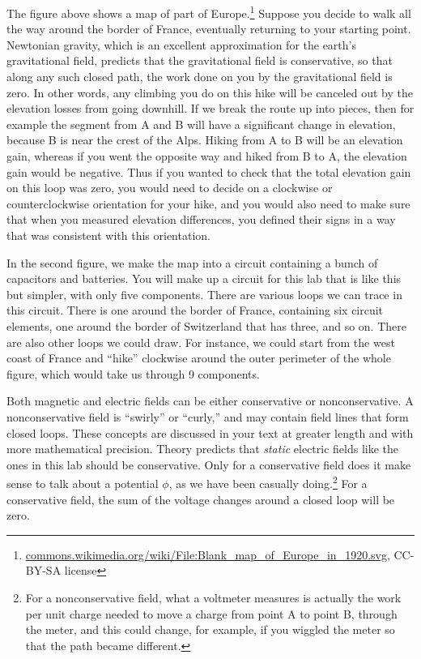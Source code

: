 The figure above shows a map of part of Europe.\footnote{\url{commons.wikimedia.org/wiki/File:Blank_map_of_Europe_in_1920.svg},
CC-BY-SA license} Suppose you decide to walk all the way around the border of France,
eventually returning to your starting point. Newtonian gravity, which is an excellent approximation for the earth's
gravitational field, predicts that the gravitational field is conservative, so that along any such closed path,
the work done on you by the gravitational field is zero. In other words, any climbing you do on this hike will be canceled
out by the elevation losses from going downhill. If we break the route up into pieces, then for example the segment
from A and B will have a significant change in elevation, because B is near the crest of the Alps. Hiking from A to B
will be an elevation gain, whereas if you went the opposite way and hiked from B to A, the elevation gain would be
negative. Thus if you wanted to check that the total elevation gain on this loop was zero, you would need to decide
on a clockwise or counterclockwise orientation for your hike, and you would also need to make sure that when you
measured elevation differences, you defined their signs in a way that was consistent with this orientation.

In the second figure, we make the map into a circuit containing a bunch of capacitors and batteries. You will make
up a circuit for this lab that is like this but simpler, with only five components.
There are various loops we can trace in this circuit. There is one around the border of France, containing six circuit
elements, one around the border of Switzerland that has three, and so on. There are also other loops we could draw.
For instance, we could start from the west coast of France and ``hike'' clockwise around the outer perimeter of the whole
figure, which would take us through 9 components.

Both magnetic and electric fields can be either conservative or nonconservative.
A nonconservative field is ``swirly'' or ``curly,'' and may contain field lines
that form closed loops. These concepts are discussed in your text at greater length and
with more mathematical precision. Theory predicts that \emph{static} electric fields
like the ones in this lab should be conservative. Only for a conservative field does
it make sense to talk about a potential $\phi$, as we have been casually 
doing.\footnote{For a nonconservative field, what a voltmeter measures is actually the work
per unit charge needed to move a charge from point A to point B, through the meter, and this could
change, for example, if you wiggled the meter so that the path became different.}
For a conservative field, the sum of the voltage changes around a closed loop will be zero. 

